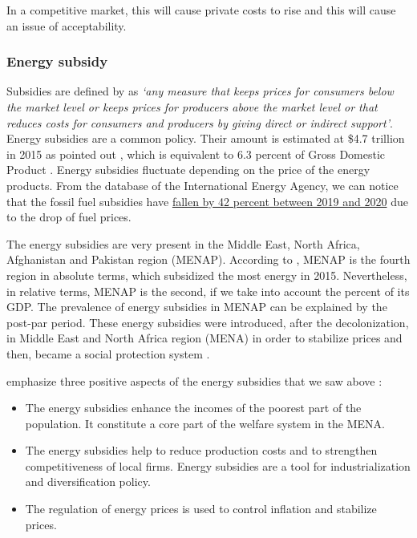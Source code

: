 \documentclass[
]{article}
\begin{document}
In a competitive market, this will cause private costs to rise and this
will cause an issue of acceptability.

\hypertarget{energy-subsidy}{%
\subsubsection{Energy subsidy}\label{energy-subsidy}}

Subsidies are defined by \textcite{demoor1997} as \emph{`any measure
that keeps prices for consumers below the market level or keeps prices
for producers above the market level or that reduces costs for consumers
and producers by giving direct or indirect support'}. Energy subsidies
are a common policy. Their amount is estimated at \$4.7 trillion in 2015
as pointed out \textcite{coady2019}, which is equivalent to 6.3 percent
of Gross Domestic Product . Energy subsidies fluctuate depending on the
price of the energy products. From the database of the International
Energy Agency, we can notice that the fossil fuel subsidies have
\href{https://www.iea.org/topics/energy-subsidies}{fallen by 42 percent
between 2019 and 2020} due to the drop of fuel prices.

The energy subsidies are very present in the Middle East, North Africa,
Afghanistan and Pakistan region (MENAP). According to
\textcite{coady2019}, MENAP is the fourth region in absolute terms,
which subsidized the most energy in 2015. Nevertheless, in relative
terms, MENAP is the second, if we take into account the percent of its
GDP. The prevalence of energy subsidies in MENAP can be explained by the
post-par period. These energy subsidies were introduced, after the
decolonization, in Middle East and North Africa region (MENA) in order
to stabilize prices and then, became a social protection system
\autocite{verme2017}.

\textcite{fattouh2013} emphasize three positive aspects of the energy
subsidies that we saw above :

\begin{itemize}
\item
  The energy subsidies enhance the incomes of the poorest part of the
  population. It constitute a core part of the welfare system in the
  MENA.
\item
  The energy subsidies help to reduce production costs and to strengthen
  competitiveness of local firms. Energy subsidies are a tool for
  industrialization and diversification policy.
\item
  The regulation of energy prices is used to control inflation and
  stabilize prices.
\end{itemize}
\end{document}
